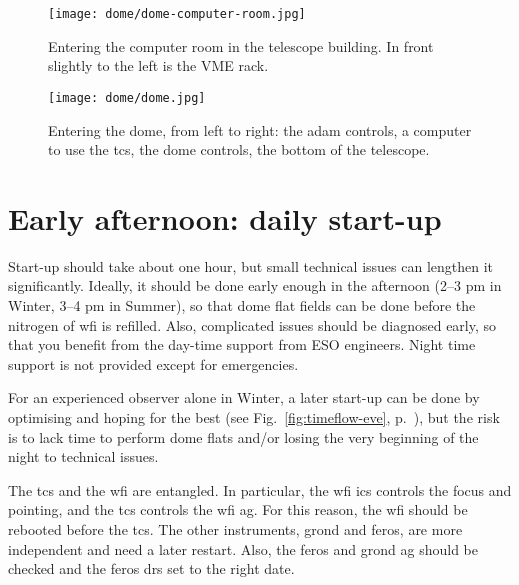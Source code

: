 \documentclass[11pt,fleqn]{book}
\def\figref#1{Fig.~\ref{fig:#1}, p.~\pageref{fig:#1}}
\begin{document}
\begin{figure}[!ht]
\centering
\texttt{[image: dome/dome-computer-room.jpg]}
\caption[Entering the computer room in the telescope building]{Entering the computer room in the telescope building. In front slightly to the left is the VME rack.} 
\label{fig:computer-room}
\end{figure}

\begin{figure}[!ht]
\centering
\texttt{[image: dome/dome.jpg]}
\caption[Entering the dome]{Entering the dome, from left to right: the \gls{adam} controls,
a computer to use the \gls{tcs}, the dome controls, the bottom of the telescope.}
\label{fig:dome}
\end{figure}

\cleardoublepage



%                                       
%                                  
%
%


\chapter{Early afternoon: daily start-up}
\label{sec:startup}

Start-up should take about one hour, but small technical issues can lengthen it significantly.  Ideally, it should be done early enough in the afternoon (2--3 pm in Winter, 3--4 pm in Summer), so that dome flat fields can be done before the nitrogen of \gls{wfi} is refilled.  Also, complicated issues should be diagnosed early, so that you benefit from the day-time support from ESO engineers.  Night time support is not provided except for emergencies.

For an experienced observer alone in Winter, a later start-up can be done by optimising and hoping for the best (see \figref{timeflow-eve}), but the risk is to lack time to perform dome flats and/or losing the very beginning of the night to technical issues.

The \gls{tcs} and the \gls{wfi} are entangled.  In particular, the \gls{wfi} \gls{ics} controls the focus and pointing, and the \gls{tcs} controls the \gls{wfi} \gls{ag}.  For this reason, the \gls{wfi} should be rebooted before the \gls{tcs}.  The other instruments, \gls{grond} and \gls{feros}, are more independent and need a later restart. Also, the \gls{feros} and \gls{grond} \gls{ag} should be checked and the \gls{feros} \gls{drs} set to the right date.
\end{document}
